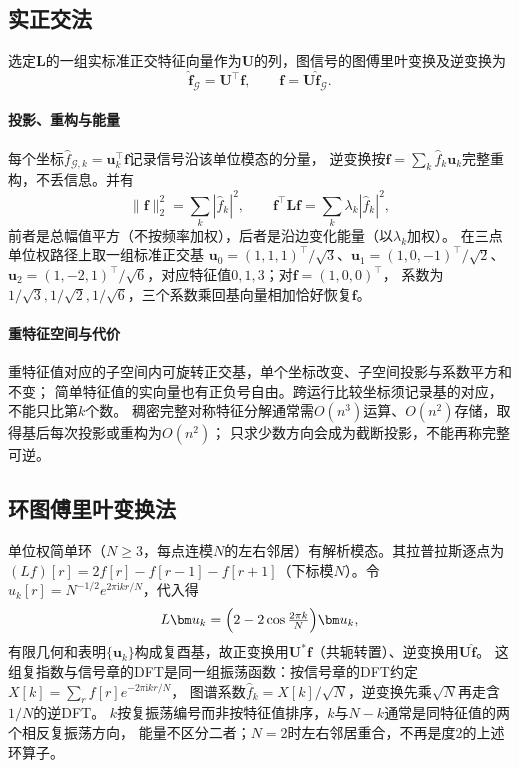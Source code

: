 \subsection{实正交法}
\begin{definition}[图傅里叶变换]
  \label{def:signal-analysis-graph-fourier-transform}
  选定$\bm L$的一组实标准正交特征向量作为$\bm U$的列，图信号的图傅里叶变换及逆变换为
  \begin{equation}
    \widehat{\bm f}_{\mathcal G}=\bm U^\top\bm f,\qquad
    \bm f=\bm U\widehat{\bm f}_{\mathcal G}.
    \label{eq:signal-analysis-graph-fourier}
  \end{equation}
\end{definition}
\paragraph{投影、重构与能量}
每个坐标$\widehat f_{\mathcal G,k}=\bm u_k^\top\bm f$记录信号沿该单位模态的分量，
逆变换按$\bm f=\sum_k\widehat f_k\bm u_k$完整重构，不丢信息。并有
\[
  \|\bm f\|_2^2=\sum_k|\widehat f_k|^2,\qquad
  \bm f^\top\bm L\bm f=\sum_k\lambda_k|\widehat f_k|^2,
\]
前者是总幅值平方（不按频率加权），后者是沿边变化能量（以$\lambda_k$加权）。
在三点单位权路径上取一组标准正交基
$\bm u_0=(1,1,1)^\top/\sqrt3$、$\bm u_1=(1,0,-1)^\top/\sqrt2$、
$\bm u_2=(1,-2,1)^\top/\sqrt6$，对应特征值$0,1,3$；对$\bm f=(1,0,0)^\top$，
系数为$1/\sqrt3,1/\sqrt2,1/\sqrt6$，三个系数乘回基向量相加恰好恢复$\bm f$。

\paragraph{重特征空间与代价}
重特征值对应的子空间内可旋转正交基，单个坐标改变、子空间投影与系数平方和不变；
简单特征值的实向量也有正负号自由。跨运行比较坐标须记录基的对应，不能只比第$k$个数。
稠密完整对称特征分解通常需$O(n^3)$运算、$O(n^2)$存储，取得基后每次投影或重构为$O(n^2)$；
只求少数方向会成为截断投影，不能再称完整可逆。

\subsection{环图傅里叶变换法}
单位权简单环（$N\geq3$，每点连模$N$的左右邻居）有解析模态。其拉普拉斯逐点为
$(L f)[r]=2f[r]-f[r-1]-f[r+1]$（下标模$N$）。令$u_k[r]=N^{-1/2}e^{2\pi\mathrm i kr/N}$，代入得
\[
  L\bm u_k=\Bigl(2-2\cos\tfrac{2\pi k}{N}\Bigr)\bm u_k,
\]
有限几何和表明$\{\bm u_k\}$构成复酉基，故正变换用$\bm U^*\bm f$（共轭转置）、逆变换用$\bm U\widehat{\bm f}$。
这组复指数与信号章的DFT是同一组振荡函数：按信号章的DFT约定$X[k]=\sum_r f[r]e^{-2\pi\mathrm i kr/N}$，
图谱系数$\widehat f_k=X[k]/\sqrt N$，逆变换先乘$\sqrt N$再走含$1/N$的逆DFT。
$k$按复振荡编号而非按特征值排序，$k$与$N-k$通常是同特征值的两个相反复振荡方向，
能量不区分二者；$N=2$时左右邻居重合，不再是度$2$的上述环算子。

